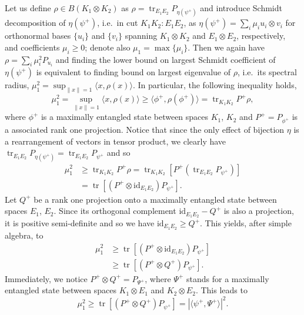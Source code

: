 \documentclass[reqno]{amsart}
\theoremstyle{plain}
\theoremstyle{note}
\newcommand\id{\mathrm{id}}
\newcommand\tr{\operatorname{tr}}
\newcommand{\ptr}[2]{\operatorname{tr}_{#1}{#2}}
\newcommand{\proj}[1]{P_{#1}}
\begin{document}
Let us define $\rho\in B(K_1 \otimes K_2)$ as $\rho = \ptr{E_1 E_2}{\proj{\eta(\psi^+)}}$ and introduce Schmidt decomposition of $\eta (\psi^+)$, i.e.~in cut $K_1 K_2 : E_1 E_2$, as $\eta(\psi^+) = \sum_{i} \mu_{i} u_i \otimes v_i$ for orthonormal bases $\{u_i\}$ and $\{v_i\}$ spanning $K_1 \otimes K_2$ and $E_1 \otimes E_2$, respectively, and coefficients $\mu_i \geqslant 0$; denote also $\mu_1 = \max{\{\mu_i\}}$. Then we again have $\rho = \sum_i \mu_{i}^{2} \proj{u_i}$ and finding the lower bound on largest Schmidt coefficient of $\eta(\psi^+)$ is equivalent to finding bound on largest eigenvalue of $\rho$, i.e.~its spectral radius, $\mu_{1}^{2} = \sup_{\| x \| = 1}{\langle x, \rho (x) \rangle}$. In particular, the following inequality holds,
\begin{equation}
    \mu_{1}^{2} = \sup_{\| x \| = 1}{\langle x, \rho (x) \rangle} \geqslant \langle \phi^+ , \rho (\phi^+) \rangle = \ptr{K_1 K_2}{P^+\rho},
\end{equation}
where $\phi^+$ is a maximally entangled state between spaces $K_1$, $K_2$ and $P^+ = \proj{\phi^+}$ is a associated rank one projection. Notice that since the only effect of bijection $\eta$ is a rearrangement of vectors in tensor product, we clearly have $\ptr{E_1 E_2}{\proj{\eta(\psi^+)}} = \ptr{E_1 E_2}{\proj{\psi^+}}$ and so
\begin{align}
    \mu_{1}^{2} &\geqslant \ptr{K_1 K_2}{P^+ \rho} = \ptr{K_1 K_2}{\left[ P^+ \left(\ptr{E_1 E_2}{\proj{\psi^+}}\right)\right]} \\
    &= \tr{\left[ \left( P^+ \otimes \id_{E_1 E_2} \right) \proj{\psi^+}\right]}.\nonumber
\end{align}
Let $Q^+$ be a rank one projection onto a maximally entangled state between spaces $E_1$, $E_2$. Since its orthogonal complement $\id_{E_1 E_2} - Q^+$ is also a projection, it is positive semi-definite and so we have $\id_{E_1 E_2} \geqslant Q^+$. This yields, after simple algebra, to
\begin{align}
    \mu_{1}^{2} &\geqslant \tr{\left[ \left( P^+ \otimes \id_{E_1 E_2} \right) \proj{\psi^+}\right]}\\
    &\geqslant \tr{\left[ \left( P^+ \otimes Q^+ \right) \proj{\psi^+}\right]}.\nonumber
\end{align}
Immediately, we notice $P^+ \otimes Q^+ = \proj{\Psi^+}$, where $\Psi^+$ stands for a maximally entangled state between spaces $K_1 \otimes E_1$ and $K_2 \otimes E_2$. This leads to
\begin{equation}\label{eq:mu1lowerBound}
    \mu_{1}^{2} \geqslant \tr{\left[ \left( P^+ \otimes Q^+ \right) \proj{\psi^+}\right]} = \left| \langle \psi^+ , \Psi^+ \rangle \right|^{2}.
\end{equation}
\end{document}
